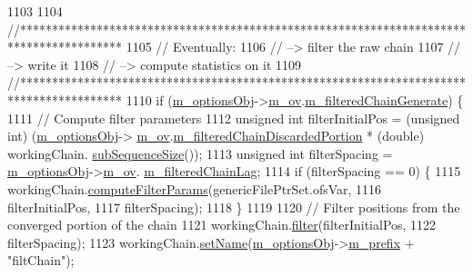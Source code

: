 \begin{DoxyCode}
1103 \textcolor{preprocessor}{}
1104   \textcolor{comment}{//****************************************************************************************}
1105   \textcolor{comment}{// Eventually:}
1106   \textcolor{comment}{// --> filter the raw chain}
1107   \textcolor{comment}{// --> write it}
1108   \textcolor{comment}{// --> compute statistics on it}
1109   \textcolor{comment}{//****************************************************************************************}
1110   \textcolor{keywordflow}{if} (\hyperlink{class_q_u_e_s_o_1_1_metropolis_hastings_s_g_a5d0bc9f73d50d272aa6bfb5ef5939ef3}{m\_optionsObj}->\hyperlink{class_q_u_e_s_o_1_1_metropolis_hastings_s_g_options_a9d4792d9fc2dc5439b8ab489b0c236eb}{m\_ov}.\hyperlink{class_q_u_e_s_o_1_1_mh_options_values_afe02816132a862e807ea3675b4125ccb}{m\_filteredChainGenerate}) \{
1111     \textcolor{comment}{// Compute filter parameters}
1112     \textcolor{keywordtype}{unsigned} \textcolor{keywordtype}{int} filterInitialPos = (\textcolor{keywordtype}{unsigned} int) (\hyperlink{class_q_u_e_s_o_1_1_metropolis_hastings_s_g_a5d0bc9f73d50d272aa6bfb5ef5939ef3}{m\_optionsObj}->
      \hyperlink{class_q_u_e_s_o_1_1_metropolis_hastings_s_g_options_a9d4792d9fc2dc5439b8ab489b0c236eb}{m\_ov}.\hyperlink{class_q_u_e_s_o_1_1_mh_options_values_afdaa37947c3a5c5acc11b89fa0a98fb9}{m\_filteredChainDiscardedPortion} * (\textcolor{keywordtype}{double}) workingChain.
      \hyperlink{class_q_u_e_s_o_1_1_base_vector_sequence_afd6278702d40bdf1044697bbd6ad1957}{subSequenceSize}());
1113     \textcolor{keywordtype}{unsigned} \textcolor{keywordtype}{int} filterSpacing    = \hyperlink{class_q_u_e_s_o_1_1_metropolis_hastings_s_g_a5d0bc9f73d50d272aa6bfb5ef5939ef3}{m\_optionsObj}->\hyperlink{class_q_u_e_s_o_1_1_metropolis_hastings_s_g_options_a9d4792d9fc2dc5439b8ab489b0c236eb}{m\_ov}.
      \hyperlink{class_q_u_e_s_o_1_1_mh_options_values_abd87b32b15f3ce695d910b48d837094f}{m\_filteredChainLag};
1114     \textcolor{keywordflow}{if} (filterSpacing == 0) \{
1115       workingChain.\hyperlink{class_q_u_e_s_o_1_1_base_vector_sequence_a8e34f6205e26eab1e9cbe457dbd376bc}{computeFilterParams}(genericFilePtrSet.ofsVar,
1116                                        filterInitialPos,
1117                                        filterSpacing);
1118     \}
1119 
1120     \textcolor{comment}{// Filter positions from the converged portion of the chain}
1121     workingChain.\hyperlink{class_q_u_e_s_o_1_1_base_vector_sequence_adfb88fdbaa1c6b2b040ef888633619ef}{filter}(filterInitialPos,
1122                         filterSpacing);
1123     workingChain.\hyperlink{class_q_u_e_s_o_1_1_base_vector_sequence_a0a2f78cd12e0f136f7801f7d0175b849}{setName}(\hyperlink{class_q_u_e_s_o_1_1_metropolis_hastings_s_g_a5d0bc9f73d50d272aa6bfb5ef5939ef3}{m\_optionsObj}->\hyperlink{class_q_u_e_s_o_1_1_metropolis_hastings_s_g_options_a4f7c510aaa530336d24259e2a89f5d0b}{m\_prefix} + \textcolor{stringliteral}{"filtChain"});

\end{DoxyCode}
